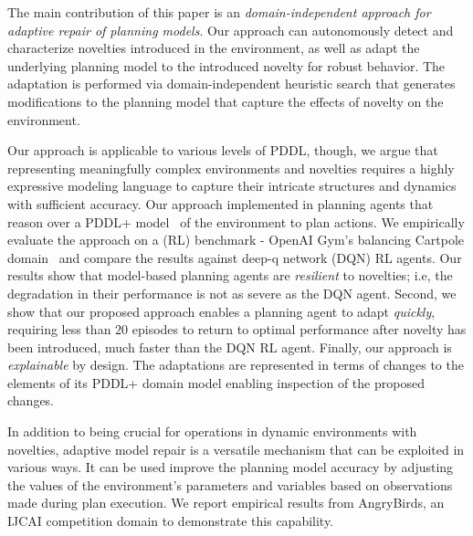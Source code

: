 \documentclass[letterpaper]{article} %
\begin{document}
The main contribution of this paper is an \emph{domain-independent approach for adaptive repair of planning models}. Our approach can autonomously detect and characterize novelties introduced in the environment, as well as adapt the underlying planning model to the introduced novelty for robust behavior. The adaptation is performed via domain-independent heuristic search that generates modifications to the planning model that capture the effects of novelty on the environment. 

Our approach is applicable to various levels of PDDL, though, we argue that representing meaningfully complex environments and novelties requires a highly expressive modeling language to capture their intricate structures and dynamics with sufficient accuracy. Our approach implemented in planning agents that reason over a PDDL+ model~\cite{fox2006modelling} of the environment to plan actions. 
We empirically evaluate the approach on a (RL) benchmark - OpenAI Gym's balancing Cartpole domain~\cite{barto1983neuronlike,brockman2016openai} and compare the results against deep-q network (DQN) RL agents. Our results show that model-based planning agents are \emph{resilient} to novelties; i.e, the degradation in their performance is not as severe as the DQN agent. Second, we show that our proposed approach enables a planning agent to adapt \emph{quickly}, requiring less than $20$ episodes to return to optimal performance after novelty has been introduced, much faster than the DQN RL agent. Finally, our approach is  \emph{explainable} by design. The adaptations are represented in terms of changes to the elements of its PDDL+ domain model enabling inspection of the proposed changes. 

In addition to being crucial for operations in dynamic environments with novelties, adaptive model repair is a versatile mechanism that can be exploited in various ways. It can be used improve the planning model accuracy by adjusting the values of the environment's parameters and variables based on observations made during plan execution. We report empirical results from AngryBirds, an IJCAI competition domain to demonstrate this capability.
\end{document}
